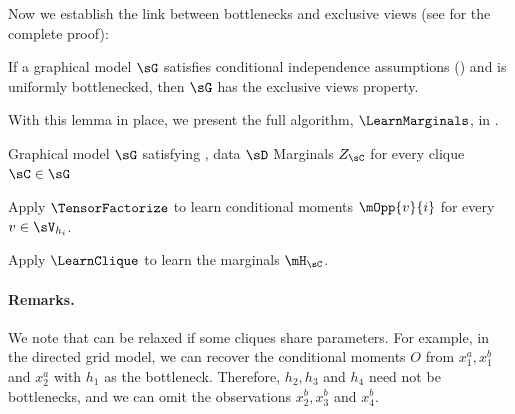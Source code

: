 Now we establish the link between bottlenecks and exclusive views
(see  for the complete proof):
\begin{lemma}
  \label{lem:bottleneck-views}  
  If a graphical model $\sG$ satisfies conditional independence
  assumptions () and is uniformly bottlenecked, then
  $\sG$ has the exclusive views property.
\end{lemma}

With this lemma in place, we present the full algorithm, $\LearnMarginals$,
in .

\begin{algorithm}
  \caption{\LearnMarginals}
  \label{algo:directed}
  \begin{algorithmic}
    \REQUIRE Graphical model $\sG$ satisfying , data $\sD$
    \ENSURE Marginals $Z_\sC$ for every clique $\sC \in \sG$

        \STATE Apply $\TensorFactorize$ to learn conditional moments
        $\mOpp{v}{i}$ for every $v \in \sV_{h_i}$.

      \ENDFOR
\STATE Apply $\LearnClique$ to learn the marginals $\mH_\sC$.
\ENDFOR
  \end{algorithmic}
\end{algorithm}



\paragraph{Remarks.} We note that  can be relaxed if some cliques
  share parameters.
For example, in the directed grid model, we can recover the conditional moments $O$ from
  $x^a_1, x^b_1$ and $x^a_2$ with $h_1$ as the bottleneck.
  Therefore, $h_2, h_3$ and $h_4$
  need not be bottlenecks, and we can omit the observations $x^b_2, x^b_3$ and $x^b_4$.

